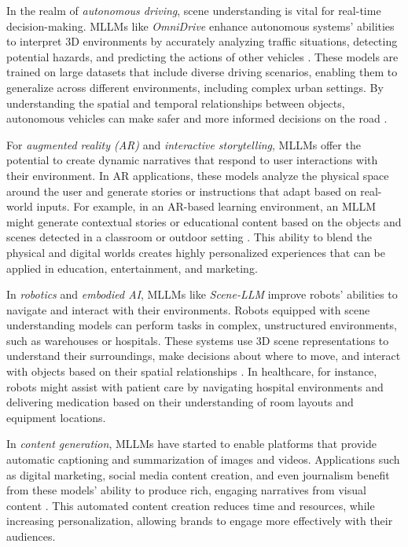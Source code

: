 In the realm of \textit{autonomous driving}, scene understanding is vital for real-time decision-making. MLLMs like \textit{OmniDrive} enhance autonomous systems' abilities to interpret 3D environments by accurately analyzing traffic situations, detecting potential hazards, and predicting the actions of other vehicles \cite{vs2024alvarez}. These models are trained on large datasets that include diverse driving scenarios, enabling them to generalize across different environments, including complex urban settings. By understanding the spatial and temporal relationships between objects, autonomous vehicles can make safer and more informed decisions on the road \cite{vs2024rao}.

For \textit{augmented reality (AR)} and \textit{interactive storytelling}, MLLMs offer the potential to create dynamic narratives that respond to user interactions with their environment. In AR applications, these models analyze the physical space around the user and generate stories or instructions that adapt based on real-world inputs. For example, in an AR-based learning environment, an MLLM might generate contextual stories or educational content based on the objects and scenes detected in a classroom or outdoor setting \cite{vs2019dey}. This ability to blend the physical and digital worlds creates highly personalized experiences that can be applied in education, entertainment, and marketing.

In \textit{robotics} and \textit{embodied AI}, MLLMs like \textit{Scene-LLM} improve robots' abilities to navigate and interact with their environments. Robots equipped with scene understanding models can perform tasks in complex, unstructured environments, such as warehouses or hospitals. These systems use 3D scene representations to understand their surroundings, make decisions about where to move, and interact with objects based on their spatial relationships \cite{vs2024rao}. In healthcare, for instance, robots might assist with patient care by navigating hospital environments and delivering medication based on their understanding of room layouts and equipment locations.

In \textit{content generation}, MLLMs have started to enable platforms that provide automatic captioning and summarization of images and videos. Applications such as digital marketing, social media content creation, and even journalism benefit from these models' ability to produce rich, engaging narratives from visual content \cite{vs2024zang}. This automated content creation reduces time and resources, while increasing personalization, allowing brands to engage more effectively with their audiences.

